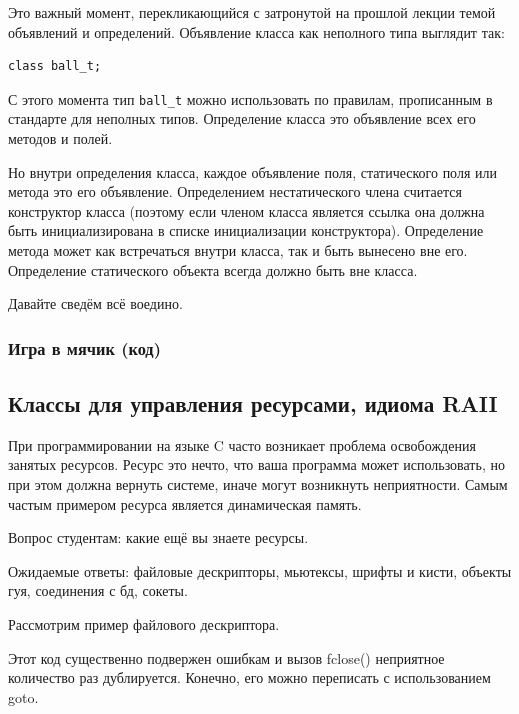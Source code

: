 \documentclass[a4paper,12pt,oneside]{article}
\begin{document}
Это важный момент, перекликающийся с затронутой на прошлой лекции темой объявлений и определений. Объявление класса как неполного типа выглядит так:

\begin{lstlisting}
class ball_t;
\end{lstlisting}

С этого момента тип \lstinline!ball_t! можно использовать по правилам, прописанным в стандарте для неполных типов. Определение класса это объявление всех его методов и полей.

Но внутри определения класса, каждое объявление поля, статического поля или метода это его объявление. Определением нестатического члена считается конструктор класса (поэтому если членом класса является ссылка она должна быть инициализирована в списке инициализации конструктора). Определение метода может как встречаться внутри класса, так и быть вынесено вне его. Определение статического объекта всегда должно быть вне класса.

Давайте сведём всё воедино.

\subsubsection{Игра в мячик (код)}



\subsection{Классы для управления ресурсами, идиома RAII}

При программировании на языке C часто возникает проблема освобождения занятых ресурсов. Ресурс это нечто, что ваша программа может использовать, но при этом должна вернуть системе, иначе могут возникнуть неприятности. Самым частым примером ресурса является динамическая память.

Вопрос студентам: какие ещё вы знаете ресурсы.

Ожидаемые ответы: файловые дескрипторы, мьютексы, шрифты и кисти, объекты гуя, соединения с бд, сокеты.

Рассмотрим пример файлового дескриптора.



Этот код существенно подвержен ошибкам и вызов fclose() неприятное количество раз дублируется. Конечно, его можно переписать с использованием goto.
\end{document}
